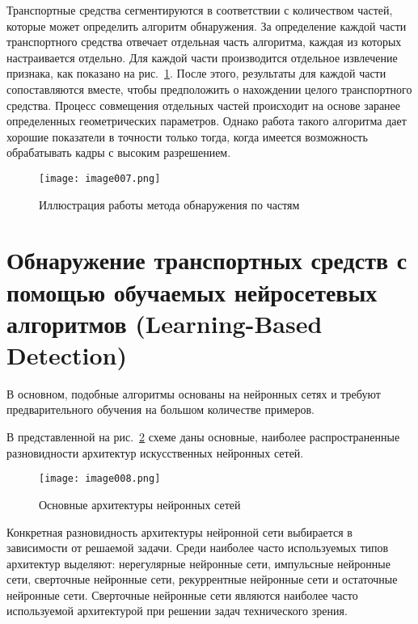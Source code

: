 Транспортные средства сегментируются в соответствии с количеством частей, которые может определить алгоритм обнаружения. За определение каждой части транспортного средства отвечает отдельная часть алгоритма, каждая из которых настраивается отдельно. Для каждой части производится отдельное извлечение признака, как показано на рис.~\ref{fig:image007}. После этого, результаты для каждой части сопоставляются вместе, чтобы предположить о нахождении целого транспортного средства. Процесс совмещения отдельных частей происходит на основе заранее определенных геометрических параметров. Однако работа такого алгоритма дает хорошие показатели в точности только тогда, когда имеется возможность обрабатывать кадры с высоким разрешением. 

\begin{figure}[htbp]
\centering
\texttt{[image: image007.png]}
\caption{Иллюстрация работы метода обнаружения по частям~\cite{ten}}%
\label{fig:image007}
\end{figure}

\section{Обнаружение транспортных средств с помощью обучаемых нейросетевых алгоритмов (Learning-Based Detection)}

В основном, подобные алгоритмы основаны на нейронных сетях и требуют предварительного обучения на большом количестве примеров.

В представленной на рис.~\ref{fig:image008} схеме даны основные, наиболее распространенные разновидности архитектур искусственных нейронных сетей.

\begin{figure}[htbp]
\centering
\texttt{[image: image008.png]}
\caption{Основные архитектуры нейронных сетей}%
\label{fig:image008}
\end{figure}

Конкретная разновидность архитектуры нейронной сети выбирается в зависимости от решаемой задачи. Среди наиболее часто используемых типов архитектур выделяют: нерегулярные нейронные сети, импульсные нейронные сети, сверточные нейронные сети, рекуррентные нейронные сети и остаточные нейронные сети. Сверточные нейронные сети являются наиболее часто используемой архитектурой при решении задач технического зрения.

